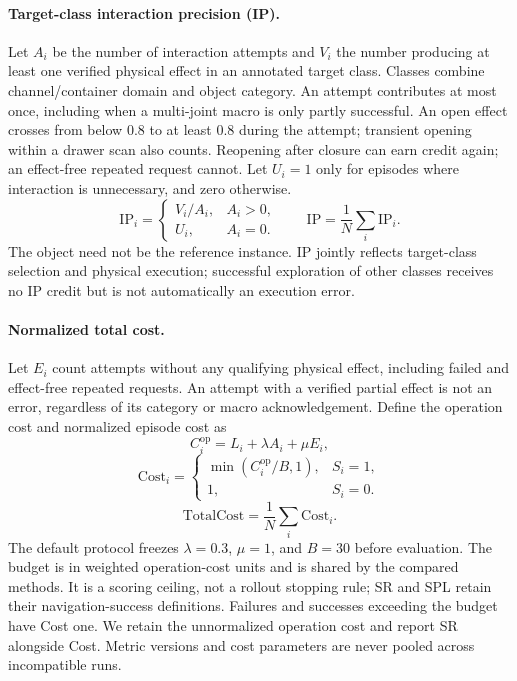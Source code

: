 \paragraph{Target-class interaction precision (IP).}
Let $A_i$ be the number of interaction attempts and $V_i$ the number producing
at least one verified physical effect in an annotated target class. Classes
combine channel/container domain and object category. An attempt contributes
at most once, including when a multi-joint macro is only partly successful.
An open effect crosses from below $0.8$ to at least $0.8$ during the attempt;
transient opening within a drawer scan also counts. Reopening after closure
can earn credit again; an effect-free repeated request cannot. Let $U_i=1$
only for episodes where interaction is unnecessary, and zero otherwise.
\begin{equation}
\mathrm{IP}_i=\begin{cases}V_i/A_i,&A_i>0,\\U_i,&A_i=0.\end{cases}
\qquad \mathrm{IP}=\frac{1}{N}\sum_i\mathrm{IP}_i.
\end{equation}
The object need not be the reference instance. IP jointly reflects target-class
selection and physical execution; successful exploration of other classes
receives no IP credit but is not automatically an execution error.

\paragraph{Normalized total cost.}
Let $E_i$ count attempts without any qualifying physical effect, including
failed and effect-free repeated requests. An attempt with a verified partial
effect is not an error, regardless of its category or macro acknowledgement.
Define the operation cost and normalized episode cost as
\begin{equation}
C_i^{\mathrm{op}}=L_i+\lambda A_i+\mu E_i,
\end{equation}
\begin{equation}
\mathrm{Cost}_i=\begin{cases}
\min(C_i^{\mathrm{op}}/B,1),&S_i=1,\\
1,&S_i=0.
\end{cases}
\end{equation}
\begin{equation}
\mathrm{TotalCost}=\frac{1}{N}\sum_i\mathrm{Cost}_i.
\end{equation}
The default protocol freezes $\lambda=0.3$, $\mu=1$, and $B=30$ before
evaluation. The budget is in weighted operation-cost units and is shared by
the compared methods. It is a scoring ceiling, not a rollout stopping rule;
SR and SPL retain their navigation-success definitions. Failures and successes
exceeding the budget have Cost one. We retain the unnormalized operation cost
and report SR alongside Cost. Metric versions and cost parameters are never
pooled across incompatible runs.
